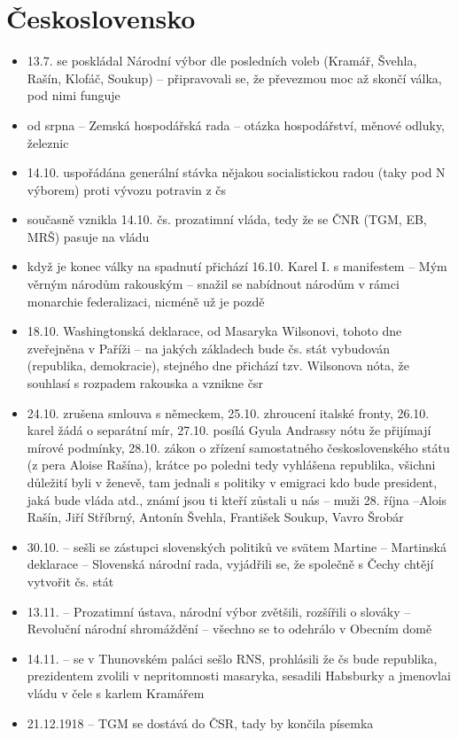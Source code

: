 \documentclass{article}
\begin{document}
\section{Československo}
\begin{itemize}
  \item 13.7. se poskládal Národní výbor dle posledních voleb (Kramář, Švehla, Rašín, Klofáč, Soukup) -- připravovali se, že převezmou moc až skončí válka, pod nimi funguje
  \item od srpna -- Zemská hospodářská rada -- otázka hospodářství, měnové odluky, železnic
  \item 14.10. uspořádána generální stávka nějakou socialistickou radou (taky pod N výborem) proti vývozu potravin z čs
  \item současně vznikla 14.10. čs. prozatimní vláda, tedy že se ČNR (TGM, EB, MRŠ) pasuje na vládu
  \item když je konec války na spadnutí přichází 16.10. Karel I. s manifestem -- Mým věrným národům rakouským -- snažil se nabídnout národům v rámci monarchie federalizaci, nicméně už je pozdě
  \item 18.10. Washingtonská deklarace, od Masaryka Wilsonovi, tohoto dne zveřejněna v Paříži -- na jakých základech bude čs. stát vybudován (republika, demokracie), stejného dne přichází tzv. Wilsonova nóta, že souhlasí s rozpadem rakouska a vznikne čsr
  \item 24.10. zrušena smlouva s německem, 25.10. zhroucení italské fronty, 26.10. karel žádá o separátní mír, 27.10. posílá Gyula Andrassy nótu že přijímají mírové podmínky, 28.10. zákon o zřízení samostatného československého státu (z pera Aloise Rašína), krátce po poledni tedy vyhlášena republika, všichni důležití byli v ženevě, tam jednali s politiky v emigraci kdo bude president, jaká bude vláda atd., známí jsou ti kteří zůstali u nás -- muži 28. října --Alois Rašín, Jiří Stříbrný, Antonín Švehla, František Soukup, Vavro Šrobár
  \item 30.10. -- sešli se zástupci slovenských politiků ve svätem Martine -- Martinská deklarace -- Slovenská národní rada, vyjádřili se, že společně s Čechy chtějí vytvořit čs. stát
  \item 13.11. -- Prozatimní ústava, národní výbor zvětšili, rozšířili o slováky -- Revoluční národní shromáždění -- všechno se to odehrálo v Obecním domě
  \item 14.11. -- se v Thunovském paláci sešlo RNS, prohlásili že čs bude republika, prezidentem zvolili v nepritomnosti masaryka, sesadili Habsburky a jmenovlai vládu v čele s karlem Kramářem
  \item 21.12.1918 -- TGM se dostává do ČSR, tady by končila písemka
\end{itemize}
\end{document}
